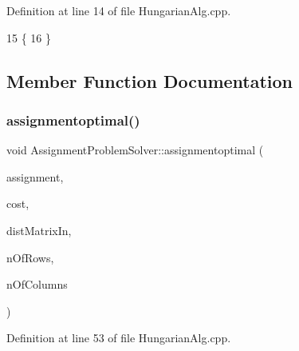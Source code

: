 Definition at line 14 of file Hungarian\+Alg.\+cpp.


\begin{DoxyCode}
15 \{
16 \}
\end{DoxyCode}


\subsection{Member Function Documentation}
\mbox{\label{class_assignment_problem_solver_a5b84a5167984db1050821926f52b5187}} 
\subsubsection{\texorpdfstring{assignmentoptimal()}{assignmentoptimal()}}
{\footnotesize\ttfamily void Assignment\+Problem\+Solver\+::assignmentoptimal (\begin{DoxyParamCaption}\item[{\mbox{\hyperlink{_hungarian_alg_8h_ad7b9f569a9adbd958c668a36b6884ffd}{assignments\+\_\+t}} \&}]{assignment,  }\item[{\mbox{\hyperlink{defines_8h_a7ce9c8817b42ab418e61756f579549ab}{track\+\_\+t}} \&}]{cost,  }\item[{const \mbox{\hyperlink{_hungarian_alg_8h_af6ab0ee8259a51215f62e8f96416d5bb}{dist\+Matrix\+\_\+t}} \&}]{dist\+Matrix\+In,  }\item[{size\+\_\+t}]{n\+Of\+Rows,  }\item[{size\+\_\+t}]{n\+Of\+Columns }\end{DoxyParamCaption})\hspace{0.3cm}{\ttfamily [private]}}



Definition at line 53 of file Hungarian\+Alg.\+cpp.


